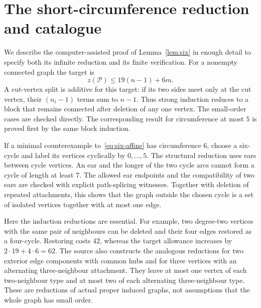 \section{The short-circumference reduction and catalogue}\label{app:terminal}
We describe the computer-assisted proof of Lemma~\ref{lem:six} in enough
detail to specify both its infinite reduction and its finite verification.
For a nonempty connected graph the target is
\begin{equation}\label{eq:six-affine}
                    z(\mathcal P)\le19(n-1)+6m.
\end{equation}
A cut-vertex split is additive for this target: if its two sides meet only
at the cut vertex, their $(n_i-1)$ terms sum to $n-1$. Thus strong induction
reduces to a block that remains connected after deletion of any one vertex.
The small-order cases are checked directly. The corresponding result for
circumference at most $5$ is proved first by the same block induction.

If a minimal counterexample to~\eqref{eq:six-affine} has circumference $6$,
choose a six-cycle and label its vertices cyclically by $0,\ldots,5$.
The structural reduction uses ears between cycle vertices. An ear and the
longer of the two cycle arcs cannot form a cycle of length at least $7$.
The allowed ear endpoints and the compatibility of two ears are checked
with explicit path-splicing witnesses. Together with deletion of repeated
attachments, this shows that the graph outside the chosen cycle is a set
of isolated vertices together with at most one edge.

Here the induction reductions are essential. For example, two degree-two
vertices with the same pair of neighbours can be deleted and their four
edges restored as a four-cycle. Restoring costs $42$, whereas the target
allowance increases by $2\cdot19+4\cdot6=62$. The source also constructs
the analogous reductions for two exterior edge components with common
hubs and for three vertices with an alternating three-neighbour attachment.
They leave at most one vertex of each two-neighbour type and at most two
of each alternating three-neighbour type. These are reductions of actual
proper induced graphs, not assumptions that the whole graph has small order.

